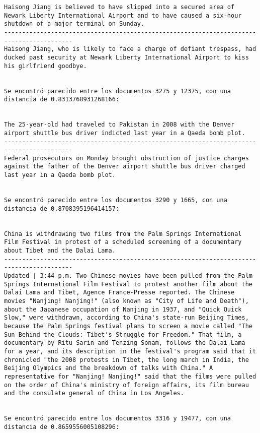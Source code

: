 \documentclass[11pt]{article}
\begin{document}
\begin{Verbatim}[commandchars=\\\{\}]
Haisong Jiang is believed to have slipped into a secured area of Newark Liberty International Airport and to have caused a six-hour shutdown of a major terminal on Sunday.
-----------------------------------------------------------------------------------------
Haisong Jiang, who is likely to face a charge of defiant trespass, had ducked past security at Newark Liberty International Airport to kiss his girlfriend goodbye.


Se encontró parecido entre los documentos 3275 y 12375, con una distancia de 0.8313768931268166:


The 25-year-old had traveled to Pakistan in 2008 with the Denver airport shuttle bus driver indicted last year in a Qaeda bomb plot.
-----------------------------------------------------------------------------------------
Federal prosecutors on Monday brought obstruction of justice charges against the father of the Denver airport shuttle bus driver charged last year in a Qaeda bomb plot.


Se encontró parecido entre los documentos 3290 y 1665, con una distancia de 0.8708395196414157:


China is withdrawing two films from the Palm Springs International Film Festival in protest of a scheduled screening of a documentary about Tibet and the Dalai Lama.
-----------------------------------------------------------------------------------------
Updated | 3:44 p.m. Two Chinese movies have been pulled from the Palm Springs International Film Festival to protest another film about the Dalai Lama and Tibet, Agence France-Presse reported. The Chinese movies "Nanjing! Nanjing!" (also known as "City of Life and Death"), about the Japanese occupation of Nanjing in 1937, and "Quick Quick Slow," were withdrawn, according to China's state-run Beijing Times, because the Palm Springs festival plans to screen a movie called "The Sun Behind the Clouds: Tibet's Struggle for Freedom." That film, a documentary by Ritu Sarin and Tenzing Sonam, follows the Dalai Lama for a year, and its description in the festival's program said that it chronicled "the 2008 protests in Tibet, the long march in India, the Beijing Olympics and the breakdown of talks with China." A representative for "Nanjing! Nanjing!" said that the films were pulled on the order of China's ministry of foreign affairs, its film bureau and the consulate general of China in Los Angeles.


Se encontró parecido entre los documentos 3316 y 19477, con una distancia de 0.8659556005108296:



\end{Verbatim}
\end{document}
